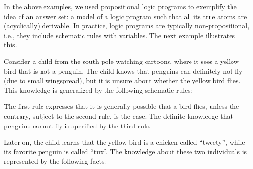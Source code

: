 In the above examples,
we used propositional logic programs to exemplify the idea
of an answer set: a model of a logic program such that all its true atoms are
(acyclically) derivable.
In practice, logic programs are typically non-propositional, i.e.,
they include schematic rules with variables.
The next example illustrates this.

\begin{example}\label{ex:flies}
Consider a child from the south pole watching cartoons,
where it sees a yellow bird that is not a penguin.
The child knows that penguins can definitely not fly (due to small wingspread),
but it is unsure about whether the yellow bird flies.
This knowledge is generalized by
the following schematic rules:
%

%
The first rule expresses that it is generally possible that a bird flies,
unless the contrary, subject to the second rule, is the case.
The definite knowledge that penguins cannot fly
is specified by the third rule.

Later on, the child learns that the yellow bird
is a chicken called ``tweety'',
while its favorite penguin is called ``tux''.
The knowledge about these two individuals is
represented by the following facts:



\end{example}
